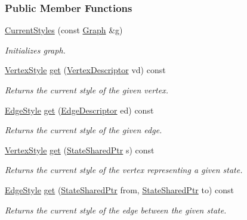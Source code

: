 \subsubsection*{Public Member Functions}
\begin{DoxyCompactItemize}
\item 
\hyperlink{structCurrentStyles_abdd69bb0b73e924267b2ae64cc685ae4}{Current\+Styles} (const \hyperlink{structCurrentStyles_af03ea3e1836532dbd394a7ccfdea1e4c}{Graph} \&g)\hypertarget{structCurrentStyles_abdd69bb0b73e924267b2ae64cc685ae4}{}\label{structCurrentStyles_abdd69bb0b73e924267b2ae64cc685ae4}

\begin{DoxyCompactList}\small\item\em Initializes graph. \end{DoxyCompactList}\item 
\hyperlink{structVertexStyle}{Vertex\+Style} \hyperlink{structCurrentStyles_ad4959448cb1628a6881f5d1b0f7b90c1}{get} (\hyperlink{structCurrentStyles_a64e3b180d16f14caf4110487114c4b8e}{Vertex\+Descriptor} vd) const 
\begin{DoxyCompactList}\small\item\em Returns the current style of the given vertex. \end{DoxyCompactList}\item 
\hyperlink{structEdgeStyle}{Edge\+Style} \hyperlink{structCurrentStyles_a86550e776297efe6960fe3afc98c8ed8}{get} (\hyperlink{structCurrentStyles_a95e023cdab7305f1870fde9411602cf5}{Edge\+Descriptor} ed) const 
\begin{DoxyCompactList}\small\item\em Returns the current style of the given edge. \end{DoxyCompactList}\item 
\hyperlink{structVertexStyle}{Vertex\+Style} \hyperlink{structCurrentStyles_a2870258cc2db6a76771fabaad6983cdb}{get} (\hyperlink{structCurrentStyles_a0cb52515f7e35aedfa2917f2fd2bc199}{State\+Shared\+Ptr} s) const 
\begin{DoxyCompactList}\small\item\em Returns the current style of the vertex representing a given state. \end{DoxyCompactList}\item 
\hyperlink{structEdgeStyle}{Edge\+Style} \hyperlink{structCurrentStyles_a296ac3bf64086cd3c618e473b44fd631}{get} (\hyperlink{structCurrentStyles_a0cb52515f7e35aedfa2917f2fd2bc199}{State\+Shared\+Ptr} from, \hyperlink{structCurrentStyles_a0cb52515f7e35aedfa2917f2fd2bc199}{State\+Shared\+Ptr} to) const 
\begin{DoxyCompactList}\small\item\em Returns the current style of the edge between the given state. \end{DoxyCompactList}\end{DoxyCompactItemize}
